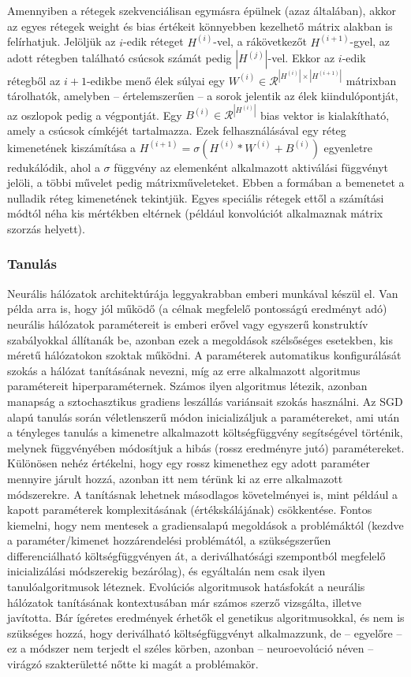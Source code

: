 Amennyiben a rétegek szekvenciálisan egymásra épülnek (azaz általában), akkor az egyes rétegek weight és bias értékeit könnyebben kezelhető mátrix alakban is felírhatjuk. Jelöljük az $i$-edik réteget $H^{(i)}$-vel, a rákövetkezőt $H^{(i+1)}$-gyel, az adott rétegben található csúcsok számát pedig $|H^{(j)}|$-vel. Ekkor az $i$-edik rétegből az $i+1$-edikbe menő élek súlyai egy $W^{(i)} \in  \mathcal{R}^{|H^{(i)}|\times|H^{(i+1)}|}$ mátrixban tárolhatók, amelyben -- értelemszerűen -- a sorok jelentik az élek kiindulópontját, az oszlopok pedig a végpontját. Egy $B^{(i)} \in \mathcal{R}^{|H^{(i)}|}$ bias vektor is kialakítható, amely a csúcsok címkéjét tartalmazza. Ezek felhasználásával egy réteg kimenetének kiszámítása a $H^{(i+1)} = \sigma(H^{(i)} * W^{(i)} + B^{(i)})$ egyenletre redukálódik, ahol a $\sigma$ függvény az elemenként alkalmazott aktiválási függvényt jelöli, a többi művelet pedig mátrixműveleteket. Ebben a formában a bemenetet a nulladik réteg kimenetének tekintjük. Egyes speciális rétegek ettől a számítási módtól néha kis mértékben eltérnek (például konvolúciót alkalmaznak mátrix szorzás helyett).

\subsubsection{Tanulás} \label{NNLearning}

Neurális hálózatok architektúrája leggyakrabban emberi munkával készül el. Van példa arra is, hogy jól működő (a célnak megfelelő pontosságú eredményt adó) neurális hálózatok paramétereit is emberi erővel vagy egyszerű konstruktív szabályokkal állítanák be, azonban ezek a megoldások szélsőséges esetekben, kis méretű hálózatokon szoktak működni. A paraméterek automatikus konfigurálását szokás a hálózat tanításának nevezni, míg az erre alkalmazott algoritmus paramétereit hiperparaméternek.
Számos ilyen algoritmus létezik, azonban manapság a sztochasztikus gradiens leszállás variánsait szokás használni. Az SGD alapú tanulás során véletlenszerű módon inicializáljuk a paramétereket, ami után a tényleges tanulás a kimenetre alkalmazott költségfüggvény segítségével történik, melynek függvényében módosítjuk a hibás (rossz eredményre jutó) paramétereket. Különösen nehéz értékelni, hogy egy rossz kimenethez egy adott paraméter mennyire járult hozzá, azonban itt nem térünk ki az erre alkalmazott módszerekre. A tanításnak lehetnek másodlagos követelményei is, mint például a kapott paraméterek komplexitásának (értékskálájának) csökkentése. Fontos kiemelni, hogy nem mentesek a gradiensalapú megoldások a problémáktól (kezdve a paraméter/kimenet hozzárendelési problémától, a szükségszerűen differenciálható költségfüggvényen át, a deriválhatósági szempontból megfelelő inicializálási módszerekig bezárólag), és egyáltalán nem csak ilyen tanulóalgoritmusok léteznek. Evolúciós algoritmusok hatásfokát a neurális hálózatok tanításának kontextusában már számos szerző vizsgálta, illetve javította\cite{ann_ga, ann_ga2}. Bár ígéretes eredmények érhetők el genetikus algoritmusokkal, és nem is szükséges hozzá, hogy deriválható költségfüggvényt alkalmazzunk, de -- egyelőre -- ez a módszer nem terjedt el széles körben, azonban -- neuroevolúció néven -- virágzó szakterületté nőtte ki magát a problémakör.

